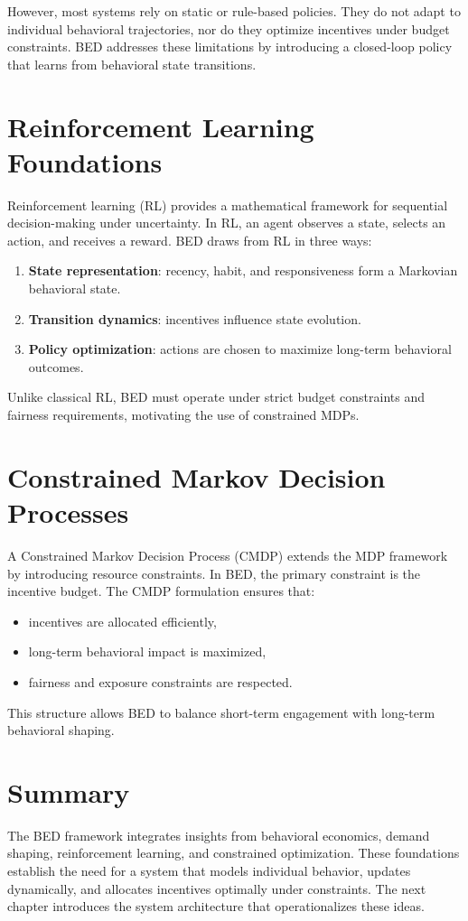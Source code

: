 However, most systems rely on static or rule-based policies. They do not adapt
to individual behavioral trajectories, nor do they optimize incentives under
budget constraints. BED addresses these limitations by introducing a closed-loop
policy that learns from behavioral state transitions.

\section{Reinforcement Learning Foundations}

Reinforcement learning (RL) provides a mathematical framework for sequential
decision-making under uncertainty. In RL, an agent observes a state, selects an
action, and receives a reward. BED draws from RL in three ways:

\begin{enumerate}
    \item \textbf{State representation}: recency, habit, and responsiveness form
    a Markovian behavioral state.
    \item \textbf{Transition dynamics}: incentives influence state evolution.
    \item \textbf{Policy optimization}: actions are chosen to maximize long-term
    behavioral outcomes.
\end{enumerate}

Unlike classical RL, BED must operate under strict budget constraints and
fairness requirements, motivating the use of constrained MDPs.

\section{Constrained Markov Decision Processes}

A Constrained Markov Decision Process (CMDP) extends the MDP framework by
introducing resource constraints. In BED, the primary constraint is the
incentive budget. The CMDP formulation ensures that:

\begin{itemize}
    \item incentives are allocated efficiently,
    \item long-term behavioral impact is maximized,
    \item fairness and exposure constraints are respected.
\end{itemize}

This structure allows BED to balance short-term engagement with long-term
behavioral shaping.

\section{Summary}

The BED framework integrates insights from behavioral economics, demand shaping,
reinforcement learning, and constrained optimization. These foundations
establish the need for a system that models individual behavior, updates
dynamically, and allocates incentives optimally under constraints. The next
chapter introduces the system architecture that operationalizes these ideas.

